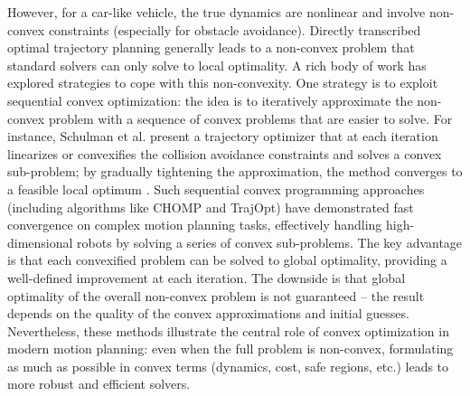 However, for a car-like vehicle, the true dynamics are nonlinear and involve non-convex constraints (especially for obstacle avoidance).
Directly transcribed optimal trajectory planning generally leads to a non-convex problem that standard solvers can only solve to local optimality.
A rich body of work has explored strategies to cope with this non-convexity.
One strategy is to exploit sequential convex optimization: the idea is to iteratively approximate the non-convex problem with a sequence of convex
problems that are easier to solve.
For instance, Schulman et al.
present a trajectory optimizer that at each iteration linearizes or convexifies the collision avoidance constraints and solves a convex sub-problem; by
gradually tightening the approximation, the method converges to a feasible local optimum \cite{schulman_finding_2013}.
Such sequential convex programming approaches (including algorithms like CHOMP and TrajOpt) have demonstrated fast convergence on complex motion
planning tasks, effectively handling high-dimensional robots by solving a series of convex sub-problems.
The key advantage is that each convexified problem can be solved to global optimality, providing a well-defined improvement at each iteration.
The downside is that global optimality of the overall non-convex problem is not guaranteed – the result depends on the quality of the convex
approximations and initial guesses.
Nevertheless, these methods illustrate the central role of convex optimization in modern motion planning: even when the full problem is non-convex,
formulating as much as possible in convex terms (dynamics, cost, safe regions, etc.) leads to more robust and efficient solvers.

